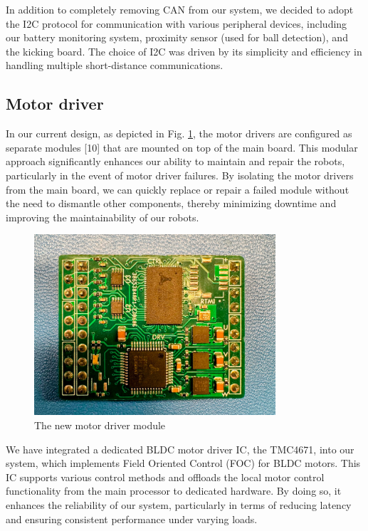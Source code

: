 \documentclass[runningheads]{llncs}
\begin{document}
In addition to completely removing CAN from our system, we decided to adopt the I2C protocol for communication with various peripheral devices, including our battery monitoring system, proximity sensor (used for ball detection), and the kicking board. The choice of I2C was driven by its simplicity and efficiency in handling multiple short-distance communications.

\subsection{Motor driver}
In our current design, as depicted in Fig. \ref{fig:motor-driver}, the motor drivers are configured as separate modules [10] that are mounted on top of the main board. This modular approach significantly enhances our ability to maintain and repair the robots, particularly in the event of motor driver failures. By isolating the motor drivers from the main board, we can quickly replace or repair a failed module without the need to dismantle other components, thereby minimizing downtime and improving the maintainability of our robots.
\begin{figure}
	\centering
	\includegraphics[width=0.8\textwidth]{images/motor-driver.jpg}
	\caption{The new motor driver module}
	\label{fig:motor-driver}
\end{figure}

We have integrated a dedicated BLDC motor driver IC, the TMC4671, into our system, which implements Field Oriented Control (FOC) for BLDC motors. This IC supports various control methods and offloads the local motor control functionality from the main processor to dedicated hardware. By doing so, it enhances the reliability of our system, particularly in terms of reducing latency and ensuring consistent performance under varying loads.
\end{document}
